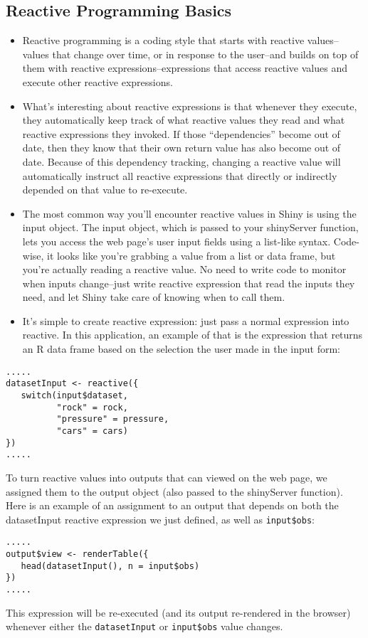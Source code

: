 \documentclass[a4paper,12pt]{article}
\begin{document}
\subsection*{Reactive Programming Basics}
\begin{itemize}
\item Reactive programming is a coding style that starts with reactive values–values that change over time, or in response to the user–and builds on top of them with reactive expressions–expressions that access reactive values and execute other reactive expressions.

\item What’s interesting about reactive expressions is that whenever they execute, they automatically keep track of what reactive values they read and what reactive expressions they invoked. If those “dependencies” become out of date, then they know that their own return value has also become out of date. Because of this dependency tracking, changing a reactive value will automatically instruct all reactive expressions that directly or indirectly depended on that value to re-execute.

\item The most common way you’ll encounter reactive values in Shiny is using the input object. The input object, which is passed to your shinyServer function, lets you access the web page’s user input fields using a list-like syntax. Code-wise, it looks like you’re grabbing a value from a list or data frame, but you’re actually reading a reactive value. No need to write code to monitor when inputs change–just write reactive expression that read the inputs they need, and let Shiny take care of knowing when to call them.

\item It’s simple to create reactive expression: just pass a normal expression into reactive. In this application, an example of that is the expression that returns an R data frame based on the selection the user made in the input form:

\end{itemize}
\newpage
\begin{framed}
\begin{verbatim}
.....
datasetInput <- reactive({
   switch(input$dataset,
          "rock" = rock,
          "pressure" = pressure,
          "cars" = cars)
})
.....
\end{verbatim}
\end{framed}
To turn reactive values into outputs that can viewed on the web page, we assigned them to the output object (also passed to the shinyServer function). Here is an example of an assignment to an output that depends on both the datasetInput reactive expression we just defined, as well as \texttt{input\$obs}:
\begin{framed}
\begin{verbatim}
.....
output$view <- renderTable({
   head(datasetInput(), n = input$obs)
})
.....
\end{verbatim}
\end{framed}
This expression will be re-executed (and its output re-rendered in the browser) whenever either the \texttt{datasetInput} or \texttt{input\$obs} value changes.
\end{document}
